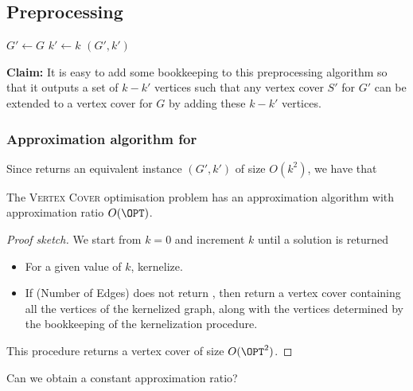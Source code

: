 \subsection{Preprocessing}

\begin{frame}
	
	\begin{algorithm}[H]
		\DontPrintSemicolon
		{\vcpre}
		
		\BlankLine
		$G'\leftarrow G$\;
		$k'\leftarrow k$\;
		\Return $(G',k')$
	\end{algorithm}
	
	\medskip
	\noindent
	\textbf{Claim:} It is easy to add some bookkeeping to this preprocessing algorithm so that it outputs a set of $k-k'$ vertices such that any vertex cover $S'$ for $G'$ can be extended to a vertex cover for $G$ by adding these $k-k'$ vertices.
\end{frame}

\begin{frame}
 \frametitle{Approximation algorithm for \VC}

Since \vcpre returns an equivalent instance $(G',k')$ of size $O(k^2)$,
we have that
\begin{corollary}
	The \textsc{Vertex Cover} optimisation problem has an approximation algorithm with approximation ratio $O(\OPT)$.
\end{corollary}
\begin{proof}[Proof sketch]
	We start from $k=0$ and increment $k$ until a solution is returned
	\begin{itemize}
		\item For a given value of $k$, kernelize.\\
		\item If (Number of Edges) does not return \No, then return a vertex cover containing all the vertices of the kernelized graph, along with the vertices determined by the bookkeeping of the kernelization procedure.
	\end{itemize}
	This procedure returns a vertex cover of size $O(\OPT^2)$.	
\end{proof}
Can we obtain a constant approximation ratio?
\end{frame}


